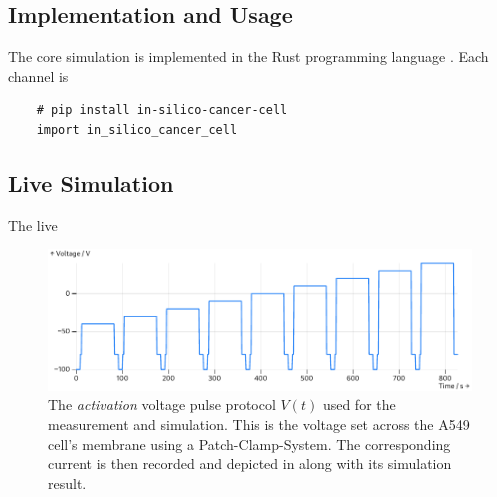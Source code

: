 \subsection{Implementation and Usage}
The core simulation is implemented in the Rust programming language \cite{2014-rust}.
Each channel is

\begin{verbatim}
    # pip install in-silico-cancer-cell
    import in_silico_cancer_cell
  \end{verbatim}

\subsection{Live Simulation}
The live

\begin{figure}
  \includegraphics[width=\columnwidth]{../figures/results/voltage-protocol.pdf}
  \caption{The \textit{activation} voltage pulse protocol $V(t)$ used for the measurement and simulation. This is the voltage set across the A549 cell's membrane using a Patch-Clamp-System. The corresponding current is then recorded and depicted in  along with its simulation result.}
  \label{figure:voltage-protocol}
\end{figure}

